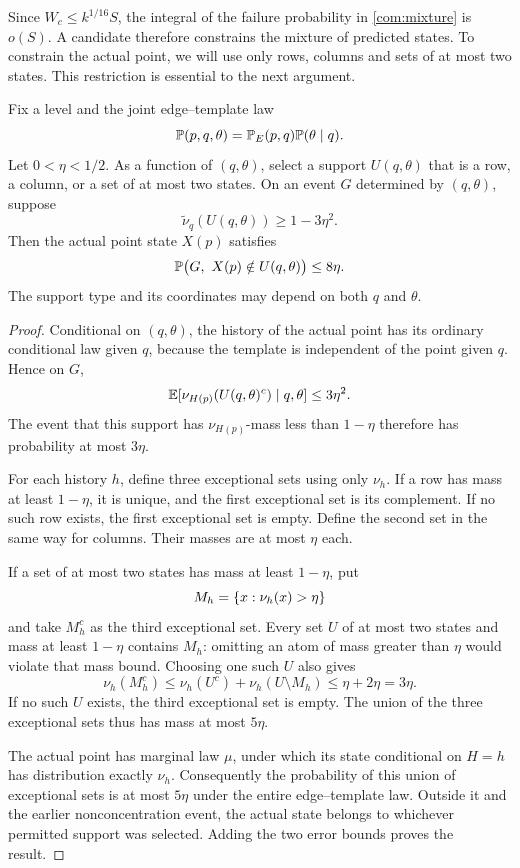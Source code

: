 Since \(W_c\le k^{1/16}S\), the integral of the failure probability in
\eqref{com:mixture} is \(o(S)\). A candidate therefore constrains the mixture
of predicted states. To constrain the actual point, we will use only rows,
columns and sets of at most two states. This restriction is essential to the
next argument.

\begin{lemma}\label{com:transfer}
Fix a level and the joint edge--template law
\[
 \mathbb P(p,q,\theta)=\mathbb P_E(p,q)\mathbb P(\theta\mid q).
\]
Let \(0<\eta<1/2\). As a function of \((q,\theta)\), select a support
\(U(q,\theta)\) that is a row, a column, or a set of at most two states.
On an event \(G\) determined by \((q,\theta)\), suppose
\[
 \widetilde\nu_q(U(q,\theta))\ge1-3\eta^2.
\]
Then the actual point state \(X(p)\) satisfies
\[
 \mathbb P\bigl(G,\ X(p)\notin U(q,\theta)\bigr)\le8\eta.
\]
The support type and its coordinates may depend on both \(q\) and \(\theta\).
\end{lemma}

\begin{proof}
Conditional on \((q,\theta)\), the history of the actual point has its
ordinary conditional law given \(q\), because the template is independent of
the point given \(q\). Hence on \(G\),
\[
 \mathbb E[\nu_{H(p)}(U(q,\theta)^c)\mid q,\theta]\le3\eta^2.
\]
The event that this support has \(\nu_{H(p)}\)-mass less than \(1-\eta\)
therefore has probability at most \(3\eta\).

For each history \(h\), define three exceptional sets using only \(\nu_h\).
If a row has mass at least \(1-\eta\), it is unique, and the first exceptional
set is its complement. If no such row exists, the first exceptional set is
empty. Define the second set in the same way for columns. Their masses are
at most \(\eta\) each.

If a set of at most two states has mass at least \(1-\eta\), put
\[
 M_h=\{x:\nu_h(x)>\eta\}
\]
and take \(M_h^c\) as the third exceptional set. Every set \(U\) of at most
two states and mass at least \(1-\eta\) contains \(M_h\): omitting an atom
of mass greater than \(\eta\) would violate that mass bound. Choosing one
such \(U\) also gives
\[
 \nu_h(M_h^c)\le\nu_h(U^c)+\nu_h(U\setminus M_h)
                 \le\eta+2\eta=3\eta.
\]
If no such \(U\) exists, the third exceptional set is empty. The union of
the three exceptional sets thus has mass at most \(5\eta\).

The actual point has marginal law \(\mu\), under which its state conditional
on \(H=h\) has distribution exactly \(\nu_h\). Consequently the probability
of this union of exceptional sets is at most \(5\eta\) under the entire
edge--template law. Outside it and the earlier nonconcentration event, the
actual state belongs to whichever permitted support was selected. Adding
the two error bounds proves the result.
\end{proof}

